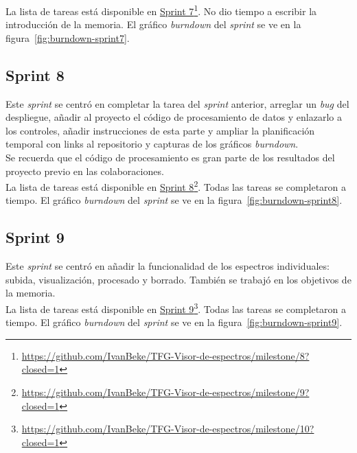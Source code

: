 La lista de tareas está disponible en
\href{https://github.com/IvanBeke/TFG-Visor-de-espectros/milestone/8?closed=1}{Sprint
	7}\footnote{\url{https://github.com/IvanBeke/TFG-Visor-de-espectros/milestone/8?closed=1}}.
No dio tiempo a escribir la introducción de la memoria. El gráfico
\textit{burndown} del \textit{sprint} se ve en la
figura~\ref{fig:burndown-sprint7}.\\


\subsection{Sprint 8}
Este \textit{sprint} se centró en completar la tarea del \textit{sprint}
anterior, arreglar un \textit{bug} del despliegue, añadir al proyecto el código
de procesamiento de datos y enlazarlo a los controles, añadir instrucciones de
esta parte y ampliar la planificación temporal con links al repositorio y
capturas de los gráficos \textit{burndown}.\\

Se recuerda que el código de procesamiento es gran parte de los resultados del
proyecto previo en las colaboraciones.\\

La lista de tareas está disponible en
\href{https://github.com/IvanBeke/TFG-Visor-de-espectros/milestone/9?closed=1}{Sprint
	8}\footnote{\url{https://github.com/IvanBeke/TFG-Visor-de-espectros/milestone/9?closed=1}}.
Todas las tareas se completaron a tiempo. El gráfico
\textit{burndown} del \textit{sprint} se ve en la
figura~\ref{fig:burndown-sprint8}.\\


\subsection{Sprint 9}
Este \textit{sprint} se centró en añadir la funcionalidad de los espectros
individuales: subida, visualización, procesado y borrado. También se trabajó en
los objetivos de la memoria.\\

La lista de tareas está disponible en
\href{https://github.com/IvanBeke/TFG-Visor-de-espectros/milestone/10?closed=1}{Sprint
	9}\footnote{\url{https://github.com/IvanBeke/TFG-Visor-de-espectros/milestone/10?closed=1}}.
Todas las tareas se completaron a tiempo. El gráfico
\textit{burndown} del \textit{sprint} se ve en la
figura~\ref{fig:burndown-sprint9}.\\

